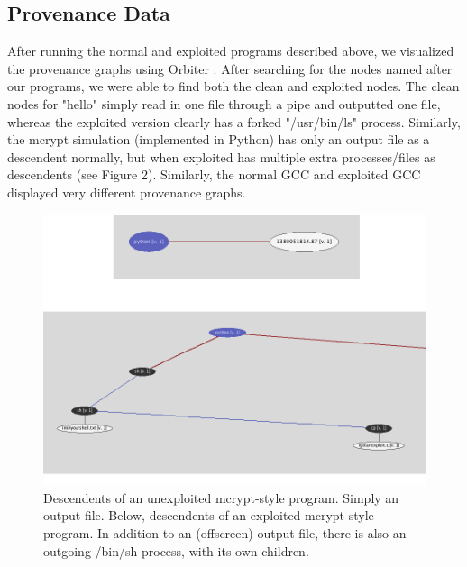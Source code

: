 \documentclass[10pt,twocolumn]{article}
\begin{document}
\subsection{Provenance Data}
After running the normal and exploited programs described above, we visualized the provenance graphs using Orbiter \cite{orbiter}. After searching for the nodes named after our programs, we were able to find both the clean and exploited nodes. The clean nodes for "hello" simply read in one file through a pipe and outputted one file, whereas the exploited version clearly has a forked "/usr/bin/ls" process. Similarly, the mcrypt simulation (implemented in Python) has only an output file as a descendent normally, but when exploited has multiple extra processes/files as descendents (see Figure 2). Similarly, the normal GCC and exploited GCC displayed very different provenance graphs. 
\begin{figure}
  \caption{Descendents of an unexploited mcrypt-style program. Simply an output file. Below, descendents of an exploited mcrypt-style program. In addition to an (offscreen) output file, there is also an outgoing /bin/sh process, with its own children.}
  \centering
    \includegraphics[width=\textwidth]{img/mcrypt.png}
\end{figure}
\end{document}
